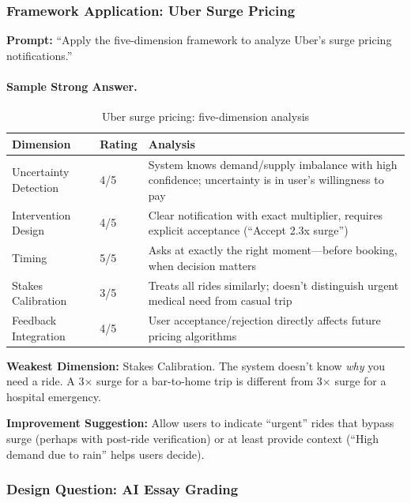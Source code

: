 \subsubsection{Framework Application: Uber Surge Pricing}

\textbf{Prompt:} ``Apply the five-dimension framework to analyze Uber's surge pricing notifications.''

\paragraph{Sample Strong Answer.}

\begin{table}[htbp]
\caption{Uber surge pricing: five-dimension analysis}
\label{tab:uber-surge}
\centering
\begin{tabular}{@{}p{3.5cm}p{1.5cm}p{7cm}@{}}
\toprule
\textbf{Dimension} & \textbf{Rating} & \textbf{Analysis} \\
\midrule
Uncertainty Detection & 4/5 & System knows demand/supply imbalance with high confidence; uncertainty is in user's willingness to pay \\
Intervention Design & 4/5 & Clear notification with exact multiplier, requires explicit acceptance (``Accept 2.3x surge'') \\
Timing & 5/5 & Asks at exactly the right moment---before booking, when decision matters \\
Stakes Calibration & 3/5 & Treats all rides similarly; doesn't distinguish urgent medical need from casual trip \\
Feedback Integration & 4/5 & User acceptance/rejection directly affects future pricing algorithms \\
\bottomrule
\end{tabular}
\end{table}

\textbf{Weakest Dimension:} Stakes Calibration. The system doesn't know \emph{why} you need a ride. A 3$\times$ surge for a bar-to-home trip is different from 3$\times$ surge for a hospital emergency.

\textbf{Improvement Suggestion:} Allow users to indicate ``urgent'' rides that bypass surge (perhaps with post-ride verification) or at least provide context (``High demand due to rain'' helps users decide).

\subsubsection{Design Question: AI Essay Grading}

